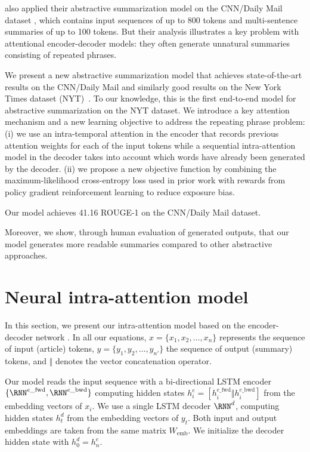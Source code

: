 \citet{nallapati2016} also applied their abstractive summarization model on the CNN/Daily Mail dataset \citep{hermann2015}, which contains input sequences of up to 800 tokens and multi-sentence summaries of up to 100 tokens. But their analysis illustrates a key problem with attentional encoder-decoder models: they often generate unnatural summaries consisting of repeated phrases.

We present a new abstractive summarization model that achieves state-of-the-art results on the CNN/Daily Mail and similarly good results on the New York Times dataset (NYT)~\citep{sandhaus2008}. To our knowledge, this is the first end-to-end model for abstractive summarization on the NYT dataset. We introduce a key attention mechanism and a new learning objective to address the repeating phrase problem: (i) we use an intra-temporal attention in the encoder that records previous attention weights for each of the input tokens while a sequential intra-attention model in the decoder takes into account which words have already been generated by the decoder. (ii) we propose a new objective function by combining the maximum-likelihood cross-entropy loss used in prior work with rewards from policy gradient reinforcement learning to reduce exposure bias.

Our model achieves 41.16 ROUGE-1 on the CNN/Daily Mail dataset.

Moreover, we show, through human evaluation of generated outputs, that our model generates more readable summaries compared to other abstractive approaches.

\section{Neural intra-attention model}

\label{sec:model}

In this section, we present our intra-attention model based on the encoder-decoder network \citep{sutskever2014}. In all our equations, $x = \{x_1, x_2, \ldots, x_n\}$ represents the sequence of input (article) tokens, $y = \{y_1, y_2, \ldots, y_{n'}\}$ the sequence of output (summary) tokens, and $\Vert$ denotes the vector concatenation operator.

Our model reads the input sequence with a bi-directional LSTM encoder $\{\RNN^{e\_\textrm{fwd}}, \RNN^{e\_\textrm{bwd}}\}$ computing hidden states $h^e_i = [h^{e\_\textrm{fwd}}_i \Vert h^{e\_\textrm{bwd}}_i]$ from the embedding vectors of $x_i$. We use a single LSTM decoder $\RNN^d$, computing hidden states $h^d_t$ from the embedding vectors of $y_t$. Both input and output embeddings are taken from the same matrix $W_\textrm{emb}$. We initialize the decoder hidden state with $h^d_0 = h^e_n$.

